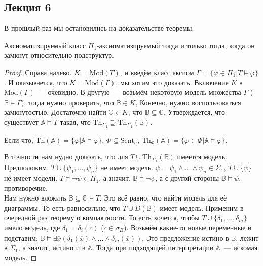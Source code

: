 \subsection{Лекция 6}

В прошлый раз мы остановились на доказательстве теоремы. \\

\begin{theorem}
    Аксиоматизируемый класс $\Pi_1$-аксиоматизируемый тогда и только тогда, когда он замкнут относительно подструктур.
\end{theorem}

\begin{proof}
    Справа налево. $K = \text{Mod}(T)$, и введём класс аксиом $\Gamma = \{\varphi \in \Pi_1 | T \models \varphi\}$. И оказывается, что $K = \text{Mod}(\Gamma)$, мы хотим это доказать. Включение $K$ в $\text{Mod}(\Gamma)$~— очевидно. В другую~— возьмём некоторую модель множества $\Gamma$ ($\mathbb{B} \models \Gamma$), тогда нужно проверить, что $\mathbb{B} \in K$, Конечно, нужно воспользоваться замкнутостью. Достаточно найти $\mathbb{C} \in K$, что $\mathbb{B} \subseteq \mathbb{C}$. Утверждается, что существует $\mathbb{A} \models T$ такая, что $\text{Th}_{\Sigma_1} \supseteq \text{Th}_{\Sigma_1}(\mathbb{B})$. 

    \begin{definition}
        Если что, $\text{Th}(\mathbb{A}) = \{\varphi | \mathbb{A} \models \varphi\}$, $\Phi \subseteq \text{Sent}_\sigma$, $\text{Th}_{\Phi}(\mathbb{A}) = \{\varphi \in \Phi | \mathbb{A} \models \varphi\}$.
    \end{definition}

    В точности нам нудно доказать, что для $T \cup \text{Th}_{\Sigma_1}(\mathbb{B})$ имеется модель. Предположим, $T \cup \{\psi_1, \ldots, \psi_n\}$ не имеет модель. $\psi = \psi_1 \wedge \ldots \wedge \psi_n \in \Sigma_1$, $T \cup \{\psi\}$ не имеет модели. $T \models \neg \psi \in \Pi_1$, а значит, $\mathbb{B} \models \neg \psi$, а с другой стороны $\mathbb{B} \models \psi$, противоречие. \\ 

    Нам нужно вложить $\mathbb{B} \subseteq \mathbb{C} \models T$. Это всё равно, что найти модель для её диаграммы. То есть равносильно, что $T \cup D(\mathbb{B})$ имеет модель. Применим в очередной раз теорему о компактности. То есть хочется, чтобы $T \cup \{\delta_1, \ldots, \delta_m\}$ имело модель, где $\delta_1 = \delta_i(\overline{c})$ ($c \in \sigma_B$). Возьмём какие-то новые переменные и подставим: $\mathbb{B} \models \exists \overline{x} (\delta_1(\overline{x}) \wedge \ldots \wedge \delta_m(\overline{x}))$. Это предложение истино в $\mathbb{B}$, лежит в $\Sigma_1$, а значит, истино и в $\mathbb{A}$. Тогда при подходящей интерпретации $\mathbb{A}$~— искомая модель.
\end{proof}

